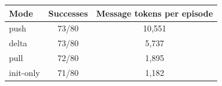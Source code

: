 \begin{tabular}{lcc}
\toprule
Mode & Successes & Message tokens per episode \\
\midrule
push & 73/80 & 10{,}551 \\
delta & 73/80 & 5{,}737 \\
pull & 72/80 & 1{,}895 \\
init-only & 71/80 & 1{,}182 \\
\bottomrule
\end{tabular}
